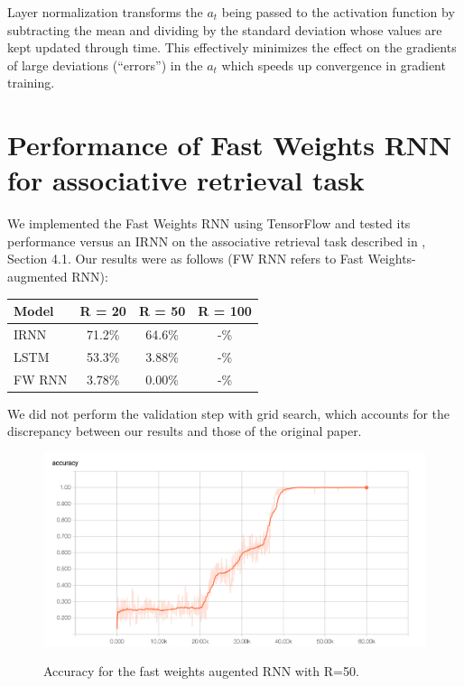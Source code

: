 Layer normalization \cite{DBLP:journals/corr/BaKH16} transforms the $a_t$ being passed to the activation function by subtracting the mean and dividing by the standard deviation whose values are kept updated through time. This effectively minimizes the effect on the gradients of large deviations (``errors'') in the $a_t$ which speeds up convergence in gradient training.

\section{Performance of Fast Weights RNN for associative retrieval task}

We implemented the Fast Weights RNN using TensorFlow \cite{abadi2016tensorflow} and tested its performance versus an IRNN on the associative retrieval task described in \citealt{DBLP:conf/nips/BaHMLI16}, Section 4.1. Our results were as follows (FW RNN refers to Fast Weights-augmented RNN):

\begin{center}
  \begin{tabular}{lccc}
    Model & R = 20 & R = 50 & R = 100 \\
    \hline
    IRNN & 71.2\% & 64.6\% & -\% \\
    LSTM & 53.3\% & 3.88\% & -\% \\
    FW RNN & 3.78\% & 0.00\% & -\%
  \end{tabular}
\end{center}
%
We did not perform the validation step with grid search, which accounts for the discrepancy between our results and those of the original paper.

\begin{figure}
  \centering
  \includegraphics[scale=0.30]{../final/images/fast_weight_r_50_accuracy.png} \\
  \caption{Accuracy for the fast weights augented RNN with R=50.}
\end{figure}

